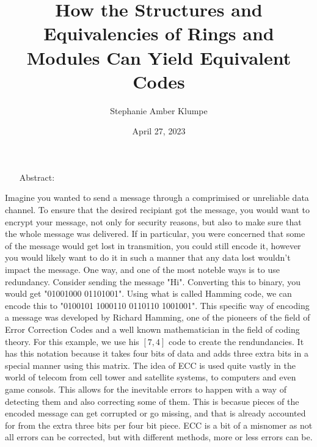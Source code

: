 

\title{How the Structures and Equivalencies of Rings and Modules Can Yield Equivalent Codes}
\author{Stephanie Amber Klumpe}
\date{April 27, 2023}



\maketitle
\newpage

\begin{enumerate}
    \item[Abstract:]  
\end{enumerate}

Imagine you wanted to send a message through a comprimised or unreliable data channel. To ensure that
the desired recipiant got the message, you would want to encrypt your message, not only for security
reasons, but also to make sure that the whole message was delivered. If in particular, you were
concerned that some of the message would get lost in transmition, you could still encode it, however you
would likely want to do it in such a manner that any data lost wouldn't impact the message. One way, and
one of the most noteble ways is to use redundancy. Consider sending the message "Hi". Converting this to
binary, you would get "01001000 01101001". Using what is called Hamming code, we can encode this to
"0100101 1000110 0110110 1001001". This specific way of encoding a message was developed by Richard
Hamming, one of the pioneers of the field of Error Correction Codes and a well known mathematician in
the field of coding theory. For this example, we use his $[7,4]$ code to create the rendundancies. It
has this notation because it takes four bits of data and adds three extra bits in a special manner using
this matrix. The idea of ECC is used quite vastly in  the world of telecom from cell tower and satellite
systems, to computers and even game consols. This allows for the inevitable errors to happen with a way
of detecting them and also correcting some of them. This is becasue pieces of the encoded message can
get corrupted or go missing, and that is already accounted for from the extra three bits per four bit
piece. ECC is a bit of a misnomer as not all errors can be corrected, but with different methods, more
or less errors can be.\\

